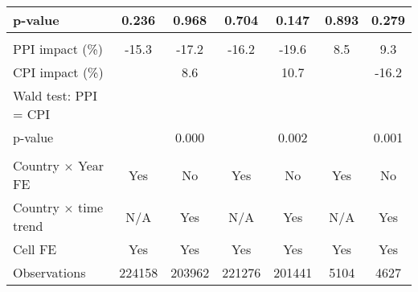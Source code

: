 {\begin{tabular}{l*{6}{c}}
\hspace{15pt} p-value&       0.236         &       0.968         &       0.704         &       0.147         &       0.893         &       0.279         \\
\hline \\ PPI impact (\%)&       -15.3         &       -17.2         &       -16.2         &       -19.6         &         8.5         &         9.3         \\
CPI impact (\%)     &                     &         8.6         &                     &        10.7         &                     &       -16.2         \\
Wald test: PPI = CPI&                     &                     &                     &                     &                     &                     \\
\hspace{15pt} p-value&                     &       0.000         &                     &       0.002         &                     &       0.001         \\
\hline \\  Country $\times$ Year FE&         Yes         &          No         &         Yes         &          No         &         Yes         &          No         \\
Country $\times$ time trend&         N/A         &         Yes         &         N/A         &         Yes         &         N/A         &         Yes         \\
Cell FE             &         Yes         &         Yes         &         Yes         &         Yes         &         Yes         &         Yes         \\
Observations        &      224158         &      203962         &      221276         &      201441         &        5104         &        4627         \\
\hline\hline
\end{tabular}
}
